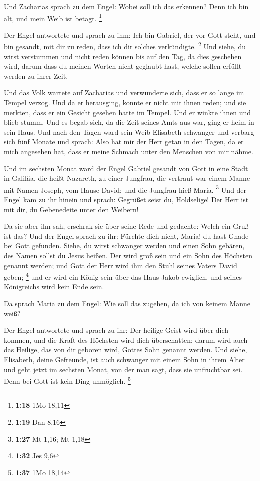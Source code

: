  Und Zacharias sprach zu dem Engel: Wobei soll ich das
erkennen? Denn ich bin alt, und mein Weib ist betagt. \footnote{\textbf{1:18}
  1Mo 18,11}

 Der Engel antwortete und sprach zu ihm: Ich bin Gabriel,
der vor Gott steht, und bin gesandt, mit dir zu reden, dass ich dir
solches verkündigte. \footnote{\textbf{1:19} Dan 8,16} 
Und siehe, du wirst verstummen und nicht reden können bis auf den Tag,
da dies geschehen wird, darum dass du meinen Worten nicht geglaubt hast,
welche sollen erfüllt werden zu ihrer Zeit.

 Und das Volk wartete auf Zacharias und verwunderte sich,
dass er so lange im Tempel verzog.  Und da er herausging,
konnte er nicht mit ihnen reden; und sie merkten, dass er ein Gesicht
gesehen hatte im Tempel. Und er winkte ihnen und blieb stumm.
 Und es begab sich, da die Zeit seines Amts aus war, ging
er heim in sein Haus.  Und nach den Tagen ward sein Weib
Elisabeth schwanger und verbarg sich fünf Monate und sprach:
 Also hat mir der Herr getan in den Tagen, da er mich
angesehen hat, dass er meine Schmach unter den Menschen von mir nähme.

 Und im sechsten Monat ward der Engel Gabriel gesandt von
Gott in eine Stadt in Galiläa, die heißt Nazareth,  zu
einer Jungfrau, die vertraut war einem Manne mit Namen Joseph, vom Hause
David; und die Jungfrau hieß Maria. \footnote{\textbf{1:27} Mt 1,16; Mt
  1,18}  Und der Engel kam zu ihr hinein und sprach:
Gegrüßet seist du, Holdselige! Der Herr ist mit dir, du Gebenedeite
unter den Weibern!

 Da sie aber ihn sah, erschrak sie über seine Rede und
gedachte: Welch ein Gruß ist das?  Und der Engel sprach
zu ihr: Fürchte dich nicht, Maria! du hast Gnade bei Gott gefunden.
 Siehe, du wirst schwanger werden und einen Sohn gebären,
des Namen sollst du Jesus heißen.  Der wird groß sein und
ein Sohn des Höchsten genannt werden; und Gott der Herr wird ihm den
Stuhl seines Vaters David geben; \footnote{\textbf{1:32} Jes 9,6}
 und er wird ein König sein über das Haus Jakob ewiglich,
und seines Königreichs wird kein Ende sein.

 Da sprach Maria zu dem Engel: Wie soll das zugehen, da
ich von keinem Manne weiß?

 Der Engel antwortete und sprach zu ihr: Der heilige
Geist wird über dich kommen, und die Kraft des Höchsten wird dich
überschatten; darum wird auch das Heilige, das von dir geboren wird,
Gottes Sohn genannt werden.  Und siehe, Elisabeth, deine
Gefreunde, ist auch schwanger mit einem Sohn in ihrem Alter und geht
jetzt im sechsten Monat, von der man sagt, dass sie unfruchtbar sei.
 Denn bei Gott ist kein Ding unmöglich. \footnote{\textbf{1:37}
  1Mo 18,14}

